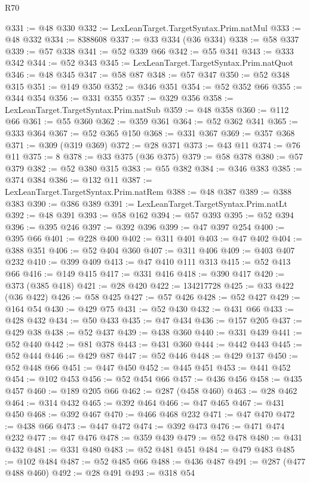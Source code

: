 \begin{lexlean}{R70}
\begin{coremodule}
@331 := @48 @330
@332 := LexLeanTarget.TargetSyntax.Prim.natMul
@333 := @48 @332
@334 := 8388608
@337 := @33 @334 (@36 @334)
@338 := @58 @337
@339 := @57 @338
@341 := @52 @339 @66
@342 := @55 @341
@343 := @333 @342
@344 := @52 @343
@345 := LexLeanTarget.TargetSyntax.Prim.natQuot
@346 := @48 @345
@347 := @58 @87
@348 := @57 @347
@350 := @52 @348 @315
@351 := @149 @350
@352 := @346 @351
@354 := @52 @352 @66
@355 := @344 @354
@356 := @331 @355
@357 := @329 @356
@358 := LexLeanTarget.TargetSyntax.Prim.natSub
@359 := @48 @358
@360 := @112 @66
@361 := @55 @360
@362 := @359 @361
@364 := @52 @362 @341
@365 := @333 @364
@367 := @52 @365 @150
@368 := @331 @367
@369 := @357 @368
@371 := @309 (@319 @369)
@372 := @28 @371
@373 := @43 @11
@374 := @76 @11
@375 := 8
@378 := @33 @375 (@36 @375)
@379 := @58 @378
@380 := @57 @379
@382 := @52 @380 @315
@383 := @55 @382
@384 := @346 @383
@385 := @374 @384
@386 := @132 @11
@387 := LexLeanTarget.TargetSyntax.Prim.natRem
@388 := @48 @387
@389 := @388 @383
@390 := @386 @389
@391 := LexLeanTarget.TargetSyntax.Prim.natLt
@392 := @48 @391
@393 := @58 @162
@394 := @57 @393
@395 := @52 @394
@396 := @395 @246
@397 := @392 @396
@399 := @47 @397 @254
@400 := @395 @66
@401 := @228 @400
@402 := @311 @401
@403 := @47 @402
@404 := @388 @351
@406 := @52 @404 @360
@407 := @311 @406
@409 := @403 @407 @232
@410 := @399 @409
@413 := @47 @410 @111 @313
@415 := @52 @413 @66
@416 := @149 @415
@417 := @331 @416
@418 := @390 @417
@420 := @373 (@385 @418)
@421 := @28 @420
@422 := 134217728
@425 := @33 @422 (@36 @422)
@426 := @58 @425
@427 := @57 @426
@428 := @52 @427
@429 := @164 @54
@430 := @429 @75
@431 := @52 @430
@432 := @431 @66
@433 := @428 @432
@434 := @50 @433
@435 := @47 @434
@436 := @157 @205
@437 := @429 @38
@438 := @52 @437
@439 := @438 @360
@440 := @331 @439
@441 := @52 @440
@442 := @81 @378
@443 := @431 @360
@444 := @442 @443
@445 := @52 @444
@446 := @429 @87
@447 := @52 @446
@448 := @429 @137
@450 := @52 @448 @66
@451 := @447 @450
@452 := @445 @451
@453 := @441 @452
@454 := @102 @453
@456 := @52 @454 @66
@457 := @436 @456
@458 := @435 @457
@460 := @189 @205 @66
@462 := @287 (@458 @460)
@463 := @28 @462
@464 := @314 @432
@465 := @392 @464
@466 := @47 @465
@467 := @431 @450
@468 := @392 @467
@470 := @466 @468 @232
@471 := @47 @470
@472 := @438 @66
@473 := @447 @472
@474 := @392 @473
@476 := @471 @474 @232
@477 := @47 @476
@478 := @359 @439
@479 := @52 @478
@480 := @431 @432
@481 := @331 @480
@483 := @52 @481 @451
@484 := @479 @483
@485 := @102 @484
@487 := @52 @485 @66
@488 := @436 @487
@491 := @287 (@477 @488 @460)
@492 := @28 @491
@493 := @318 @54

\end{coremodule}
\end{lexlean}
